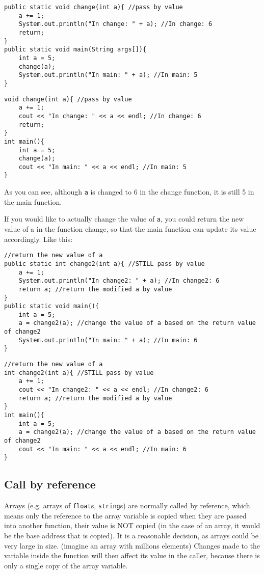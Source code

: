 \if{}
\begin{lstlisting}
public static void change(int a){ //pass by value
    a += 1;
    System.out.println("In change: " + a); //In change: 6
    return;
}
public static void main(String args[]){
    int a = 5;
    change(a);
    System.out.println("In main: " + a); //In main: 5
}
\end{lstlisting}
\else
\begin{lstlisting}
void change(int a){ //pass by value
    a += 1;
    cout << "In change: " << a << endl; //In change: 6
    return;
}
int main(){
    int a = 5;
    change(a);
    cout << "In main: " << a << endl; //In main: 5
}
\end{lstlisting}
\fi

As you can see, although \texttt{a} is changed to 6 in the change function, it is still 5 in the main function. 


If you would like to actually change the value of \texttt{a}, you could return the new value of a in the function change, so that the main function can update its value accordingly. Like this:

\if{}
\begin{lstlisting}
//return the new value of a
public static int change2(int a){ //STILL pass by value
    a += 1;
    System.out.println("In change2: " + a); //In change2: 6
    return a; //return the modified a by value
}
public static void main(){
    int a = 5;
    a = change2(a); //change the value of a based on the return value of change2
    System.out.println("In main: " + a); //In main: 6
}
\end{lstlisting}
\else
\begin{lstlisting}
//return the new value of a
int change2(int a){ //STILL pass by value
    a += 1;
    cout << "In change2: " << a << endl; //In change2: 6
    return a; //return the modified a by value
}
int main(){
    int a = 5;
    a = change2(a); //change the value of a based on the return value of change2
    cout << "In main: " << a << endl; //In main: 6
}
\end{lstlisting}
\fi

\subsection{Call by reference}

Arrays (e.g. arrays of \texttt{float}s, \texttt{string}s) are normally called by reference, which means only the reference to the array variable is copied when they are passed into another function, their value is NOT copied (in the case of an array, it would be the base address that is copied). It is a reasonable decision, as arrays could be very large in size. (imagine an array with millions elements) Changes made to the variable inside the function will then affect its value in the caller, because there is only a single copy of the array variable.

